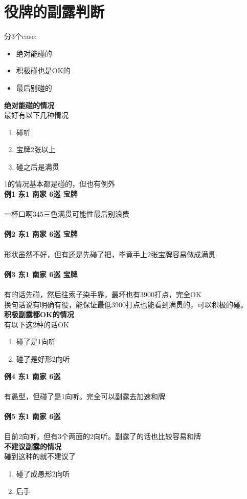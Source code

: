 \documentclass[小V的日麻笔记.tex]{subfiles}
\begin{document}
\section{役牌的副露判断}
分3个case:
\begin{itemize}
\item 绝对能碰的
\item 积极碰也是OK的
\item 最后别碰的
\end{itemize}

\textbf{绝对能碰的情况}
\\
最好有以下几种情况
\begin{enumerate}
\item 碰听
\item 宝牌2张以上
\item 碰之后是满贯
\end{enumerate}

1的情况基本都是碰的，但也有例外
\\
\textbf{例1 东1 南家 6巡 宝牌}
\\
\\
一杯口啊345三色满贯可能性最后别浪费
\\
\hrulefill
\\
\textbf{例2 东1 南家 6巡 宝牌}
\\
\\
形状虽然不好，但有还是先碰了把，毕竟手上2张宝牌容易做成满贯 
\\
\hrulefill
\\
\textbf{例3 东1 南家 6巡 宝牌}
\\
\\
有的话先碰，然后往索子染手靠，最坏也有3900打点，完全OK
\\
换句话说有明确有役，能保证最低3900打点也能看到满贯的，可以积极的碰。
\\
\textbf{积极副露都OK的情况}
\\
有以下这2种的话OK
\begin{enumerate}
\item 碰了是1向听
\item 碰了是好形2向听
\end{enumerate}

\textbf{例4 东1 南家 6巡 }
\\
\\
有愚型，但碰了是1向听。完全可以副露去加速和牌
\\
\hrulefill
\\
\textbf{例5 东1 南家 6巡 }
\\
\\
目前2向听，但有3个两面的2向听。副露了的话也比较容易和牌
\\
\textbf{不建议副露的情况}
\\
碰到这种的就不建议了
\begin{enumerate}
\item 碰了成愚形2向听
\item 后手
\end{enumerate}
\end{document}
